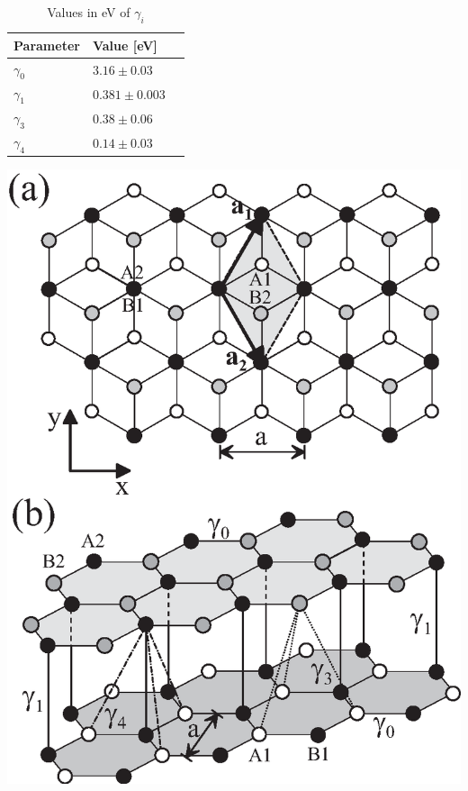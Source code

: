 \begin{table}[ht]
    \begin{minipage}[b]{0.56\linewidth}
    \centering
    \begin{tabular}{ l l r }
        \hline
        Parameter & Value [eV] \\ 
        \hline \hline
        $\gamma_0$ & $3.16\pm0.03$ \\
        $\gamma_1$ & $0.381\pm 0.003$ \\
        $\gamma_3$ & $0.38\pm 0.06$ \\
        $\gamma_4$ & $0.14\pm 0.03$ \\
        \hline
       \end{tabular}
        \caption{Values in eV of $\gamma_i$ \cite{kuzmenko2009determination}}
        \label{table:valuetable}
    \end{minipage}\hfill
    \begin{minipage}[b]{0.4\linewidth}
    \centering
    \includegraphics[width=\linewidth]{Immagini/graphene/bilayerlattice.eps}
    \label{fig:bilayer-lattice}
    \end{minipage}
\end{table}

